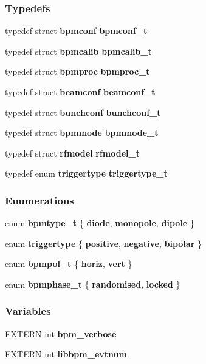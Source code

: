 \subsubsection*{Typedefs}
\begin{CompactItemize}
\item 
typedef struct {\bf bpmconf} {\bf bpmconf\_\-t}
\item 
typedef struct {\bf bpmcalib} {\bf bpmcalib\_\-t}
\item 
typedef struct {\bf bpmproc} {\bf bpmproc\_\-t}
\item 
typedef struct {\bf beamconf} {\bf beamconf\_\-t}
\item 
typedef struct {\bf bunchconf} {\bf bunchconf\_\-t}
\item 
typedef struct {\bf bpmmode} \textbf{bpmmode\_\-t}\label{group__interface_g2599c9e0c0e36819170e95dcdcdbdfc0}

\item 
typedef struct {\bf rfmodel} \textbf{rfmodel\_\-t}\label{group__interface_g98c565a46975280f28037fb092e24ec7}

\item 
typedef enum {\bf triggertype} \textbf{triggertype\_\-t}\label{group__interface_gbfc973a0ffff9e74bf9dcdad55ecd3ce}

\end{CompactItemize}
\subsubsection*{Enumerations}
\begin{CompactItemize}
\item 
enum {\bf bpmtype\_\-t} \{ {\bf diode}, 
{\bf monopole}, 
{\bf dipole}
 \}
\item 
enum {\bf triggertype} \{ {\bf positive}, 
{\bf negative}, 
{\bf bipolar}
 \}
\item 
enum {\bf bpmpol\_\-t} \{ {\bf horiz}, 
{\bf vert}
 \}
\item 
enum {\bf bpmphase\_\-t} \{ {\bf randomised}, 
{\bf locked}
 \}
\end{CompactItemize}
\subsubsection*{Variables}
\begin{CompactItemize}
\item 
EXTERN int {\bf bpm\_\-verbose}
\item 
EXTERN int {\bf libbpm\_\-evtnum}
\end{CompactItemize}


